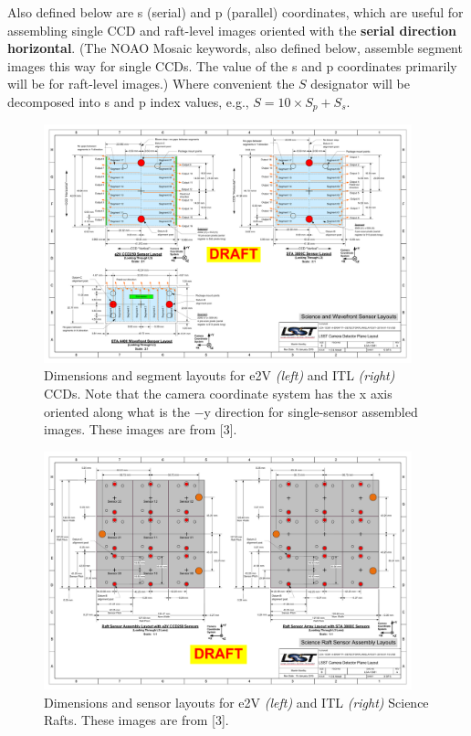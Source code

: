 \documentclass{article}[12pt]
\begin{document}
Also defined below are s (serial) and p (parallel) coordinates, which are useful for assembling single CCD and raft-level images oriented with the {\bf serial direction horizontal}.  (The NOAO Mosaic keywords, also defined below, assemble segment images this way for single CCDs.  The value of the s and p coordinates primarily will be for raft-level images.)  Where convenient the $S$ designator will be decomposed into s and p index values, e.g., $S = 10 \times S_p + S_s$.

\begin{figure}
\centering
    \includegraphics[width=0.95\textwidth]{sensor_layout.pdf}
    \caption{Dimensions and segment layouts for e2V {\it (left)} and ITL {\it (right)} CCDs.  Note that the camera coordinate system has the x axis oriented along what is the $-$y direction for single-sensor assembled images.  These images are from [3].}
    \label{fig:sensor}
\end{figure}

\begin{figure}
\centering
    \includegraphics[width=0.95\textwidth]{raft_layout.pdf}
    \caption{Dimensions and sensor layouts for e2V {\it (left)} and ITL {\it (right)} Science Rafts.  These images are from [3].}
    \label{fig:raft}
\end{figure}
\end{document}
